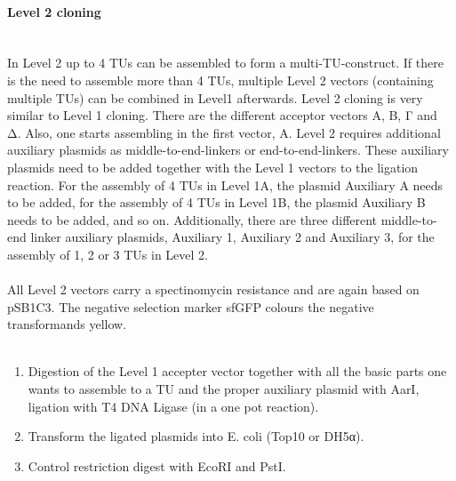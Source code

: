 \paragraph{Level 2 cloning} \mbox{}\\
In Level 2 up to 4 TUs can be assembled to form a multi-TU-construct. If there is the need to assemble more than 4 TUs, multiple Level 2 vectors (containing multiple TUs) can be combined in Level1 afterwards. Level 2 cloning is very similar to Level 1 cloning. There are the different acceptor vectors A, B, Γ and Δ. Also, one starts assembling in the first vector, A. Level 2 requires additional auxiliary plasmids as middle-to-end-linkers or end-to-end-linkers. These auxiliary plasmids need to be added together with the Level 1 vectors to the ligation reaction. For the assembly of 4 TUs in Level 1A, the plasmid Auxiliary A needs to be added, for the assembly of 4 TUs in Level 1B, the plasmid Auxiliary B needs to be added, and so on. Additionally, there are three different middle-to-end linker auxiliary plasmids, Auxiliary 1, Auxiliary 2 and Auxiliary 3, for the assembly of 1, 2 or 3 TUs in Level 2. \\ \\
All Level 2 vectors carry a spectinomycin resistance and are again based on pSB1C3. The negative selection marker sfGFP colours the negative transformands yellow. \\ \\
\begin{enumerate}
    \item Digestion of the Level 1 accepter vector together with all the basic parts one wants to assemble to a TU and the proper auxiliary plasmid with AarI, ligation with T4 DNA Ligase (in a one pot reaction).
    \item Transform the ligated plasmids into E. coli (Top10 or DH5α).
    \item Control restriction digest with EcoRI and PstI.
\end{enumerate}
